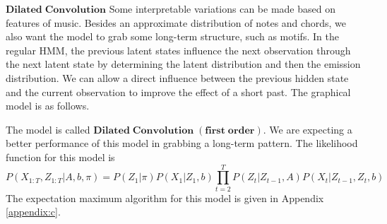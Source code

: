 \documentclass[10pt, oneside]{article}
\begin{document}
$\mathbf{Dilated\; Convolution}$
Some interpretable variations can be made based on features of music. Besides an approximate distribution of notes and chords, we also want the model to grab some long-term structure, such as motifs. In the regular HMM, the previous latent states influence the next observation through the next latent state  by determining the latent distribution and then the emission distribution. We can allow a direct influence between the previous hidden state and the current observation to improve the effect of a short past. The graphical model is as follows. 

\begin{figure}[!htb]\centering
{}
\end{figure}

The model is called $\mathbf{Dilated\;Convolution\;(first \;order)}$. We are expecting a better performance of this model in grabbing a long-term pattern. The likelihood function for this model is 
$$
P\left(X_{1: T}, Z_{1: T}| A, b, \pi \right)=P\left(Z_{1}| \pi \right) P\left(X_{1} | Z_{1}, b \right) \prod_{t=2}^{T} P\left(Z_{t} | Z_{t-1}, A\right) P\left(X_{t} | Z_{t-1},  Z_{t},b\right)
$$
The expectation maximum algorithm for this model is given in Appendix \ref{appendix:c}.\\
\end{document}
